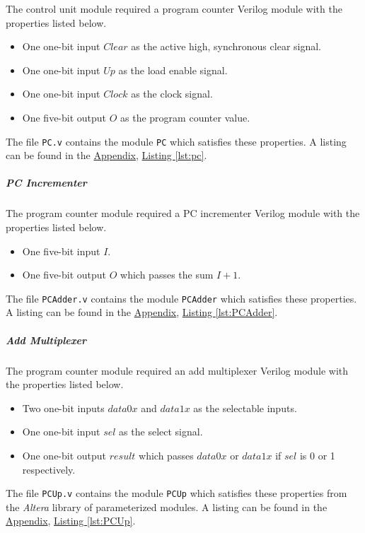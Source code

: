 The control unit module required a program counter Verilog module with the properties listed below.

\begin{itemize}
    \item One one-bit input $Clear$ as the active high, synchronous clear signal.
    \item One one-bit input $Up$ as the load enable signal.
    \item One one-bit input $Clock$ as the clock signal.
    \item One five-bit output $O$ as the program counter value.
\end{itemize}

The file \verb|PC.v| contains the module \verb|PC| which satisfies these properties.
A listing can be found in the \hyperref[sec:appendix]{Appendix}, \hyperref[lst:pc]{Listing \ref*{lst:pc}}.

\subparagraph{PC Incrementer} \label{subpar:pcadder}

The program counter module required a PC incrementer Verilog module with the properties listed below.

\begin{itemize}
    \item One five-bit input $I$.
    \item One five-bit output $O$ which passes the sum $I + 1$.
\end{itemize}

The file \verb|PCAdder.v| contains the module \verb|PCAdder| which satisfies these properties.
A listing can be found in the \hyperref[sec:appendix]{Appendix}, \hyperref[lst:PCAdder]{Listing \ref*{lst:PCAdder}}.

\subparagraph{Add Multiplexer} \label{subpar:pcup}

The program counter module required an add multiplexer Verilog module with the properties listed below.

\begin{itemize}
    \item Two one-bit inputs $data0x$ and $data1x$ as the selectable inputs.
    \item One one-bit input $sel$ as the select signal.
    \item One one-bit output $result$ which passes $data0x$ or $data1x$ if $sel$ is 0 or 1 respectively.
\end{itemize}


The file \verb|PCUp.v| contains the module \verb|PCUp| which satisfies these properties from the \emph{Altera} library of parameterized modules.
A listing can be found in the \hyperref[sec:appendix]{Appendix}, \hyperref[lst:PCUp]{Listing \ref*{lst:PCUp}}.

